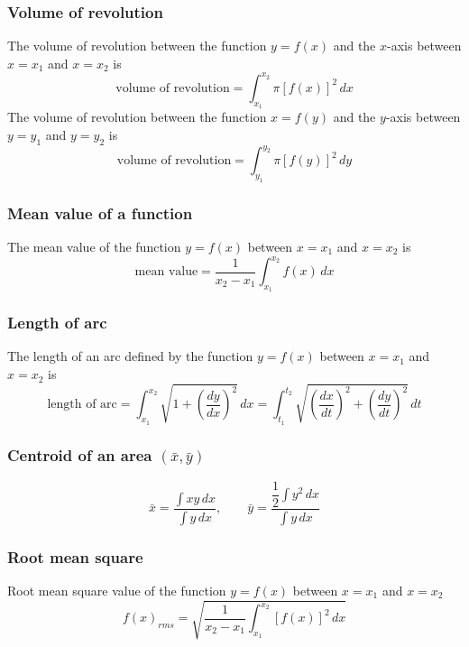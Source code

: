 \subsubsection*{Volume of revolution}
The volume of revolution between the function $y=f(x)$ and the $x$-axis between $x=x_1$ and $x=x_2$ is
$$\mbox{volume of revolution}=\int_{x_1}^{x_2} \pi [f(x)]^2 \, dx$$
The volume of revolution between the function $x=f(y)$ and the $y$-axis between $y=y_1$ and $y=y_2$ is
$$\mbox{volume of revolution}=\int_{y_1}^{y_2} \pi [f(y)]^2 \, dy$$

\subsubsection*{Mean value of a function}
The mean value of the function $y=f(x)$ between $x=x_1$ and $x=x_2$ is
$$\mbox{mean value}=\frac{1}{x_2 - x_1}\int_{x_1}^{x_2}f(x) \, dx$$

\subsubsection*{Length of arc}
The length of an arc defined by the function $y=f(x)$ between $x=x_1$ and $x=x_2$ is
$$\mbox{length of arc} = \int_{x_1}^{x_2}\sqrt{1+ \left( \frac{dy}{dx} \right)^2}\, dx = \int_{t_1}^{t_2} \sqrt{\left(\frac{dx}{dt}\right)^2 + \left( \frac{dy}{dt} \right)^2} \, dt$$

\subsubsection*{Centroid of an area $(\bar{x},\bar{y})$}
$$\bar{x}=\frac{\displaystyle\int xy \, dx}{\displaystyle\int y \, dx}, \qquad \bar{y} = \frac{\dfrac{1}{2}\displaystyle\int y^2 \, dx}{\displaystyle\int y \, dx}$$

\subsubsection*{Root mean square}
Root mean square value of the function $y=f(x)$ between $x=x_1$ and $x=x_2$
$$f(x)_{rms} = \sqrt{\frac{1}{x_2-x_1}\int_{x_1}^{x_2}[f(x)]^2 \, dx}$$